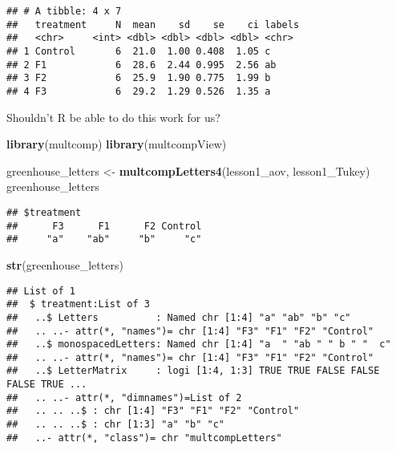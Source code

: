 \documentclass[]{book}
\newenvironment{Shaded}{\begin{snugshade}}{\end{snugshade}}
\newcommand{\KeywordTok}[1]{\textcolor[rgb]{0.13,0.29,0.53}{\textbf{#1}}}
\newcommand{\NormalTok}[1]{#1}
\newcommand{\OperatorTok}[1]{\textcolor[rgb]{0.81,0.36,0.00}{\textbf{#1}}}
\newcommand{\StringTok}[1]{\textcolor[rgb]{0.31,0.60,0.02}{#1}}
\theoremstyle{definition}
\theoremstyle{definition}
\theoremstyle{definition}
\theoremstyle{remark}
\begin{document}
\begin{verbatim}
## # A tibble: 4 x 7
##   treatment     N  mean    sd    se    ci labels
##   <chr>     <int> <dbl> <dbl> <dbl> <dbl> <chr> 
## 1 Control       6  21.0  1.00 0.408  1.05 c     
## 2 F1            6  28.6  2.44 0.995  2.56 ab    
## 3 F2            6  25.9  1.90 0.775  1.99 b     
## 4 F3            6  29.2  1.29 0.526  1.35 a
\end{verbatim}

Shouldn't R be able to do this work for us?

\begin{Shaded}
\begin{Highlighting}[]
\KeywordTok{library}\NormalTok{(multcomp)}
\KeywordTok{library}\NormalTok{(multcompView)}

\NormalTok{greenhouse_letters <-}\StringTok{ }\KeywordTok{multcompLetters4}\NormalTok{(lesson1_aov, lesson1_Tukey)}
\NormalTok{greenhouse_letters}
\end{Highlighting}
\end{Shaded}

\begin{verbatim}
## $treatment
##      F3      F1      F2 Control 
##     "a"    "ab"     "b"     "c"
\end{verbatim}

\begin{Shaded}
\begin{Highlighting}[]
\KeywordTok{str}\NormalTok{(greenhouse_letters)}
\end{Highlighting}
\end{Shaded}

\begin{verbatim}
## List of 1
##  $ treatment:List of 3
##   ..$ Letters          : Named chr [1:4] "a" "ab" "b" "c"
##   .. ..- attr(*, "names")= chr [1:4] "F3" "F1" "F2" "Control"
##   ..$ monospacedLetters: Named chr [1:4] "a  " "ab " " b " "  c"
##   .. ..- attr(*, "names")= chr [1:4] "F3" "F1" "F2" "Control"
##   ..$ LetterMatrix     : logi [1:4, 1:3] TRUE TRUE FALSE FALSE FALSE TRUE ...
##   .. ..- attr(*, "dimnames")=List of 2
##   .. .. ..$ : chr [1:4] "F3" "F1" "F2" "Control"
##   .. .. ..$ : chr [1:3] "a" "b" "c"
##   ..- attr(*, "class")= chr "multcompLetters"
\end{verbatim}

\begin{Shaded}
\end{Shaded}
\end{document}
